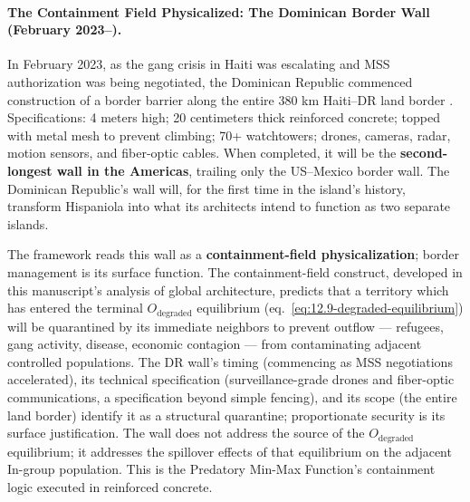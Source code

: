 \paragraph{The Containment Field Physicalized: The Dominican Border Wall (February 2023--).}
\label{par:dr_border_wall}

In February 2023, as the gang crisis in Haiti was escalating and MSS authorization was being negotiated, the Dominican Republic commenced construction of a border barrier along the entire 380 km Haiti--DR land border \cite{dr_border_wall_2023}. Specifications: 4 meters high; 20 centimeters thick reinforced concrete; topped with metal mesh to prevent climbing; 70+ watchtowers; drones, cameras, radar, motion sensors, and fiber-optic cables. When completed, it will be the \textbf{second-longest wall in the Americas}, trailing only the US--Mexico border wall. The Dominican Republic's wall will, for the first time in the island's history, transform Hispaniola into what its architects intend to function as two separate islands.

The framework reads this wall as a \textbf{containment-field physicalization}; border management is its surface function. The containment-field construct, developed in this manuscript's analysis of global architecture, predicts that a territory which has entered the terminal $O_{\text{degraded}}$ equilibrium (eq.~\ref{eq:12.9-degraded-equilibrium}) will be quarantined by its immediate neighbors to prevent outflow --- refugees, gang activity, disease, economic contagion --- from contaminating adjacent controlled populations. The DR wall's timing (commencing as MSS negotiations accelerated), its technical specification (surveillance-grade drones and fiber-optic communications, a specification beyond simple fencing), and its scope (the entire land border) identify it as a structural quarantine; proportionate security is its surface justification. The wall does not address the source of the $O_{\text{degraded}}$ equilibrium; it addresses the spillover effects of that equilibrium on the adjacent In-group population. This is the Predatory Min-Max Function's containment logic executed in reinforced concrete.

